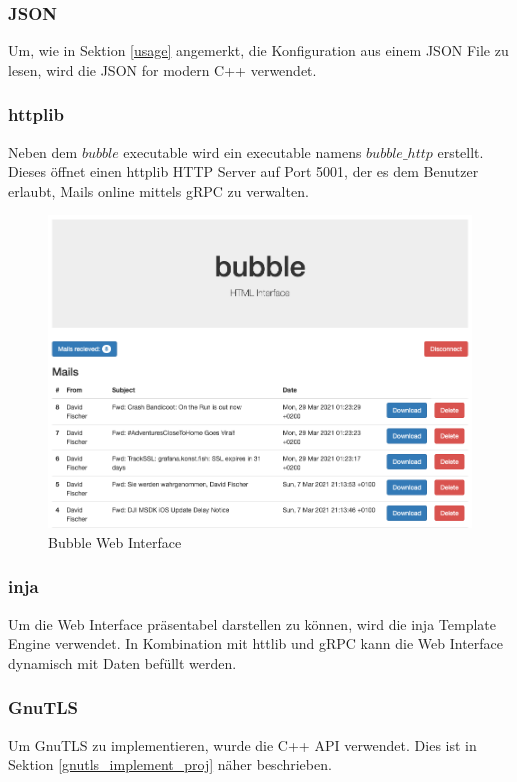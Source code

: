 \documentclass[12pt, letterpaper]{article}
\begin{document}
\subsubsection{JSON}
Um, wie in Sektion \ref{usage} angemerkt, die Konfiguration aus einem JSON File zu lesen, wird die JSON for modern C++\cite{json_ref} verwendet.

\subsubsection{httplib}
Neben dem $bubble$ executable wird ein executable namens $bubble\_http$ erstellt. Dieses öffnet einen httplib\cite{httplib-ref} HTTP Server auf Port 5001, der es dem Benutzer erlaubt, Mails online mittels gRPC zu verwalten.

\begin{figure}[H]
  \centering
  \includegraphics[width=1\textwidth]{web_interface.png}
  \caption{Bubble Web Interface}
  \label{fig:bubble_web_interface}
\end{figure}

\subsubsection{inja}
Um die Web Interface präsentabel darstellen zu können, wird die inja Template Engine\cite{inja-ref} verwendet. In Kombination mit httlib und gRPC kann die Web Interface dynamisch mit Daten befüllt werden.

\subsubsection{GnuTLS}
Um GnuTLS zu implementieren, wurde die C++ API verwendet\cite{gnutls_cpp}. Dies ist in Sektion \ref{gnutls_implement_proj} näher beschrieben.
\end{document}

